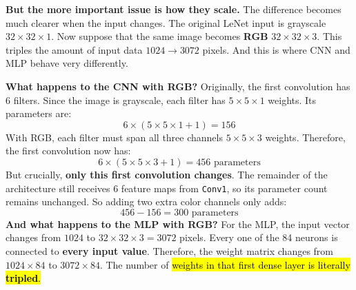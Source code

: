 \highspace
\textcolor{Red2}{ \textbf{But the more important issue is how they scale.}} The difference becomes much clearer when the input changes. The original LeNet input is grayscale $32 \times 32 \times 1$. Now suppose that the same image becomes \textbf{RGB} $32 \times 32 \times 3$. This triples the amount of input data $1024 \to 3072$ pixels. And this is where CNN and MLP behave very differently.

\highspace
\textcolor{Green3}{ \textbf{What happens to the CNN with RGB?}} Originally, the first convolution has 6 filters. Since the image is grayscale, each filter has $5 \times 5 \times 1$ weights. Its parameters are:
\begin{equation*}
    6 \times (5 \times 5 \times 1 + 1) = 156
\end{equation*}
With RGB, each filter must span all three channels $5 \times 5 \times 3$ weights. Therefore, the first convolution now has:
\begin{equation*}
    6 \times (5 \times 5 \times 3 + 1) = 456 \text{ parameters}
\end{equation*}
But crucially, \textbf{only this first convolution changes}. The remainder of the architecture still receives 6 feature maps from \texttt{Conv1}, so its parameter count remains unchanged. So adding two extra color channels only adds:
\begin{equation*}
    456 - 156 = 300 \text{ parameters}
\end{equation*}
\textcolor{Green3}{ \textbf{And what happens to the MLP with RGB?}} For the MLP, the input vector changes from $1024$ to $32 \times 32 \times 3 = 3072$ pixels. Every one of the 84 neurons is connected to \textbf{every input value}. Therefore, the weight matrix changes from $1024 \times 84$ to $3072 \times 84$. The number of \hl{weights in that first dense layer is literally \textbf{tripled}.}

